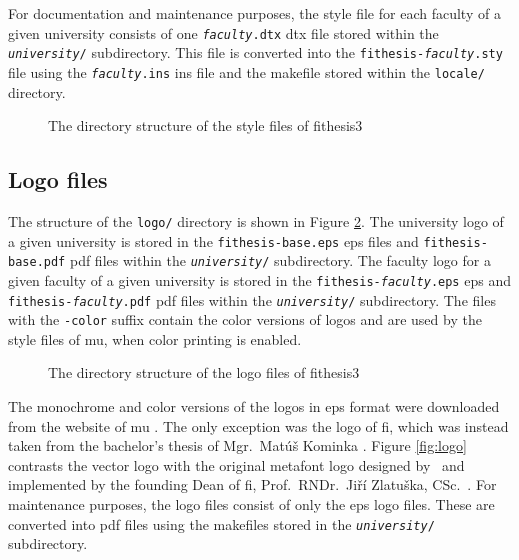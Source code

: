 \documentclass[12pt,twoside,color,table]%
  {fithesis3/fithesis3} %
\makeatletter
\def\thesis#1{\makeatletter\thesis@{#1}\makeatother}
\makeatother
\begin{document}
  For documentation and maintenance purposes, the style file for
  each faculty of a given university consists of one
  \texttt{\textit{faculty}.dtx} \gls{dtx} file stored within the
  \texttt{\textit{university}/} subdirectory. This file is
  converted into the \texttt{fithesis-\textit{faculty}.sty} file
  using the \texttt{\textit{faculty}.ins} \gls{ins} file and the
  \gls{makefile} stored within the \texttt{locale/} directory.
  
  \begin{figure}
    \centering
    \parbox{0.5\textwidth}{}
    \caption{The directory structure of the style files of
      \textsf{fithesis3}}
    \label{fig:dirs-style}
  \end{figure}
  
  \subsection{Logo files}
  The structure of the \texttt{logo/} directory is shown in Figure
  \ref{fig:dirs-logo}. The university logo of a given university is
  stored in the \texttt{fithesis-base.eps} \gls{eps} files and
  \texttt{fithesis-base.pdf} \gls{pdf} files within the
  \texttt{\textit{university}/} subdirectory. The faculty logo for
  a given faculty of a given university is stored in the
  \texttt{fithesis-\textit{faculty}.eps} \gls{eps} and
  \texttt{fithesis-\textit{faculty}.pdf} \gls{pdf} files within the
  \texttt{\textit{university}/} subdirectory. The files with the
  \texttt{-color} suffix contain the color versions of logos and
  are used by the style files of \gls{mu}, when color printing is
  enabled.

  \begin{figure}
    \centering
    \parbox{0.6\textwidth}{}
    \caption{The directory structure of the logo files of
      \textsf{fithesis3}}
    \label{fig:dirs-logo}
  \end{figure}
  
  The monochrome and color versions of the logos in \gls{eps}
  format were downloaded from the website of \gls{mu} \cite{muvis}.
  The only exception was the logo of \gls{fi}, which was instead
  taken from the bachelor's thesis of Mgr.\ Matúš Kominka
  \cite{Kominka08}. Figure \ref{fig:logo} contrasts the vector logo
  with the original \gls{metafont} logo designed by
  \thesis{advisor}\ and implemented by the founding Dean of
  \gls{fi}, Prof.\ RNDr.\ Jiří Zlatuška, CSc.~\cite{filogo}.  For
  maintenance purposes, the logo files consist of only the
  \gls{eps} logo files. These are converted into \gls{pdf} files
  using the \glspl{makefile} stored in the
  \texttt{\textit{university}/} subdirectory.
\end{document}
